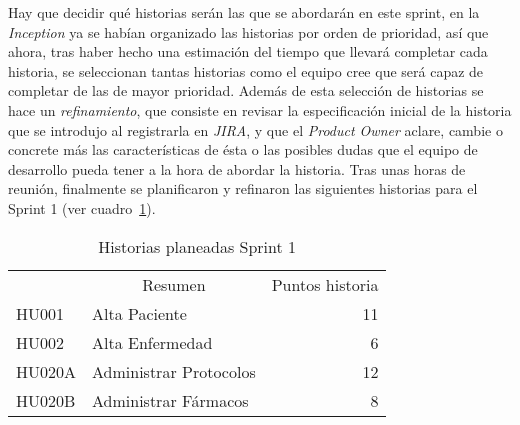 Hay que decidir qué historias serán las que se abordarán en este sprint, en la \emph{Inception} ya se habían organizado las historias por orden de prioridad, así que ahora, tras haber hecho una estimación del tiempo que llevará completar cada historia, se seleccionan tantas historias como el equipo cree que será capaz de completar de las de mayor prioridad. Además de esta selección de historias se hace un \emph{refinamiento}, que consiste en revisar la especificación inicial de la historia que se introdujo al registrarla en \emph{JIRA}, y que el \emph{Product Owner} aclare, cambie o concrete más las características de ésta o las posibles dudas que el equipo de desarrollo pueda tener a la hora de abordar la historia. Tras unas horas de reunión, finalmente se planificaron y refinaron las siguientes historias para el Sprint 1 (ver cuadro~\ref{historiasSprint1}).

\begin{table}[!h]
\centering
\caption{Historias planeadas Sprint 1}
\label{historiasSprint1}
\begin{tabular}{llr}
\rowcolor[HTML]{C0C0C0} 
\multicolumn{1}{c}{\cellcolor[HTML]{C0C0C0}Identificador} & \multicolumn{1}{c}{\cellcolor[HTML]{C0C0C0}Resumen} & \multicolumn{1}{c}{\cellcolor[HTML]{C0C0C0}Puntos historia} \\
HU001                                                     & Alta Paciente                                      & 11                                                          \\
\rowcolor[HTML]{EFEFEF} 
HU002                                                     & Alta Enfermedad                                    & 6                                                           \\
HU020A                                                   & Administrar Protocolos                              & 12                                                          \\
\rowcolor[HTML]{EFEFEF} 
HU020B                                                   & Administrar Fármacos                                & 8                                                          
\end{tabular}
\end{table}

